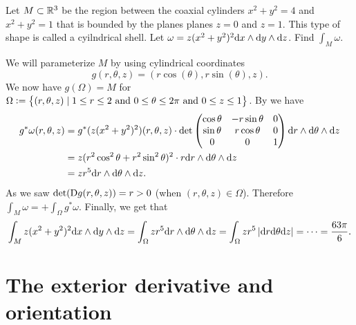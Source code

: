 \documentclass[11pt,a4paper]{article}
\begin{document}
\begin{exercise}
  Let $M \subset \mathbb{R}^3$ be the region between the coaxial cylinders
  $x^2 + y^2 = 4$ and $x^2 + y^2 = 1$ that is bounded
  by the planes planes $z = 0$ and $z = 1$.
  This type of shape is called a cyilndrical shell.
  Let $\omega = z(x^2 + y^2)^2 \dx \wedge \dy \wedge \dz$.
  Find $\int_{M} \omega$.
\end{exercise}
\begin{solution}
  We will parameterize $M$ by using cylindrical coordinates
  \[
    g(r,\theta,z) = (r\cos(\theta),r\sin(\theta),z).
  \]
  We now have $g(\Omega) = M$ for
  $\Omega := \left\{(r,\theta,z) \mid 1 \le r \le 2 \text{ and } 0 \le \theta \le 2\pi \text{ and } 0 \le z \le 1\right\}$.
  By  we have
  \begin{align*}
    g^*\omega(r,\theta,z) &=
    g^*(z(x^2 + y^2)^2)(r,\theta,z) \cdot
    \det
    \begin{pmatrix}
      \cos\theta & -r\sin\theta & 0 \\
      \sin\theta & r\cos\theta & 0 \\
      0 & 0 & 1
    \end{pmatrix}
    \mathrm{d} r \wedge \mathrm{d} \theta \wedge \mathrm{d} z \\ &=
    z(r^2\cos^2\theta + r^2\sin^2\theta)^2 \cdot r
    \mathrm{d} r \wedge \mathrm{d} \theta \wedge \mathrm{d} z \\ &=
    z r^5 \mathrm{d} r \wedge \mathrm{d} \theta \wedge \mathrm{d} z.
  \end{align*}
  As we saw $\det(\mathrm{D} g(r,\theta,z)) = r > 0$
  (when $(r,\theta,z) \in \Omega$).
  Therefore $\int_{M} \omega = + \int_{\Omega} g^* \omega$.
  Finally, we get that
  \[
    \int_{M} z(x^2 + y^2)^2 \dx \wedge \dy \wedge \dz =
    \int_{\Omega} z r^5 \dr \wedge \dtheta \wedge \dz =
    \int_{\Omega} z r^5 \abs{\dr \dtheta \dz} = \cdots =
    \frac{63\pi}{6}.
  \]
\end{solution}

\newpage
\section{The exterior derivative and orientation}
\end{document}
